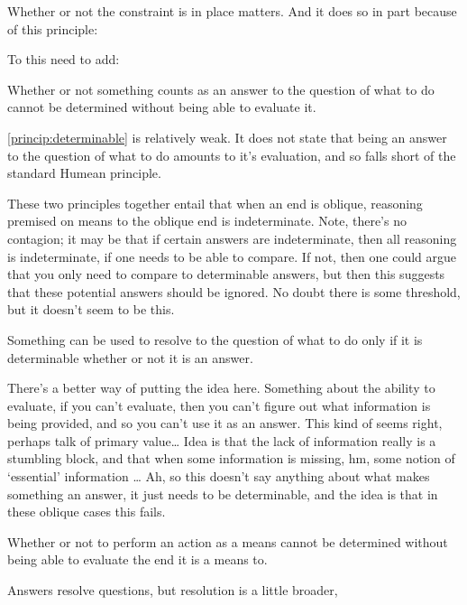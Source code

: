 \documentclass[10pt]{article}
\begin{document}
Whether or not the constraint is in place matters.
And it does so in part because of this principle:

To this need to add:
\begin{principle}\label{princip:determinable}
  Whether or not something counts as an answer to the question of what to do cannot be determined without being able to evaluate it.
\end{principle}
\autoref{princip:determinable} is relatively weak.
It does not state that being an answer to the question of what to do amounts to it's evaluation, and so falls short of the standard Humean principle.

These two principles together entail that when an end is oblique, reasoning premised on means to the oblique end is indeterminate.
Note, there's no contagion; it may be that if certain answers are indeterminate, then all reasoning is indeterminate, if one needs to be able to compare.
If not, then one could argue that you only need to compare to determinable answers, but then this suggests that these potential answers should be ignored.
No doubt there is some threshold, but it doesn't seem to be this.

\begin{principle}
  Something can be used to resolve to the question of what to do only if it is determinable whether or not it is an answer.
\end{principle}
There's a better way of putting the idea here.
Something about the ability to evaluate, if you can't evaluate, then you can't figure out what information is being provided, and so you can't use it as an answer.
This kind of seems right, perhaps talk of primary value\dots
Idea is that the lack of information really is a stumbling block, and that when some information is missing, hm, some notion of `essential' information \dots
Ah, so this doesn't say anything about what makes something an answer, it just needs to be determinable, and the idea is that in these oblique cases this fails.

\begin{principle}
  Whether or not to perform an action as a means cannot be determined without being able to evaluate the end it is a means to.
\end{principle}

Answers resolve questions, but resolution is a little broader,
\end{document}
